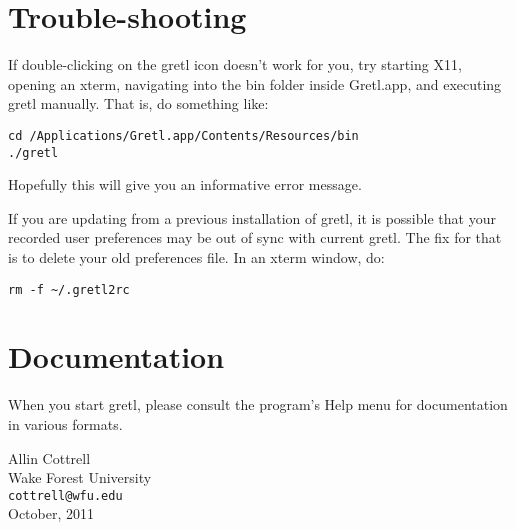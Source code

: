 \documentclass[11pt]{article}
\begin{document}
\section{Trouble-shooting}

If double-clicking on the gretl icon doesn't work for you, try
starting X11, opening an xterm, navigating into the \textsf{bin}
folder inside \textsf{Gretl.app}, and executing 
\textsf{gretl} manually.  That is, do something like:

\begin{verbatim}
cd /Applications/Gretl.app/Contents/Resources/bin
./gretl
\end{verbatim}

Hopefully this will give you an informative error message.

If you are updating from a previous installation of gretl, it
is possible that your recorded user preferences may be out of
sync with current gretl.  The fix for that is to delete
your old preferences file.  In an xterm window, do:

\begin{verbatim}
rm -f ~/.gretl2rc
\end{verbatim}

\section{Documentation}
\label{sec:doc}

When you start gretl, please consult the program's Help menu for
documentation in various formats.

\vspace{.25in}

\raggedright
Allin Cottrell \\
Wake Forest University \\
\texttt{cottrell@wfu.edu} \\
October, 2011
\end{document}
